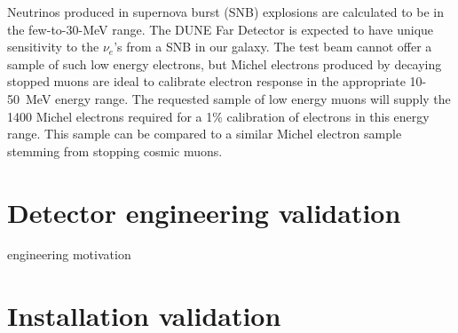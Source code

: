 \begin{itemize}
Neutrinos produced in supernova burst (SNB) explosions are calculated to be in the few-to-30-MeV range.
The DUNE Far Detector is expected to have unique sensitivity to the $\nu_e$'s from a SNB in our galaxy.
%
The test beam cannot offer a sample of  such low energy electrons, but Michel electrons  produced by 
decaying stopped muons are ideal to calibrate electron response in the appropriate 10-50~MeV energy range. 
The requested sample of low energy muons will supply the 1400 Michel electrons required for a 1\% 
calibration of electrons in this energy range. This sample can be compared to a similar Michel electron sample
stemming from stopping cosmic muons.

\end{itemize}



\section{Detector engineering validation}
engineering motivation

\section{Installation validation}




